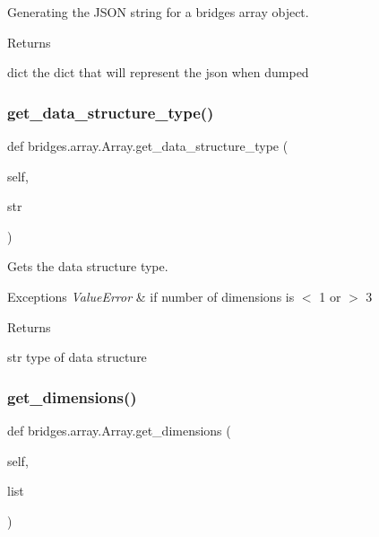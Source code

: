 Generating the J\+S\+ON string for a bridges array object. 

\begin{DoxyReturn}{Returns}


dict the dict that will represent the json when dumped 
\end{DoxyReturn}
\mbox{\label{classbridges_1_1array_1_1_array_a27dcb7a04798a215092f42506da679ce}} 
\subsubsection{\texorpdfstring{get\+\_\+data\+\_\+structure\+\_\+type()}{get\_data\_structure\_type()}}
{\footnotesize\ttfamily def bridges.\+array.\+Array.\+get\+\_\+data\+\_\+structure\+\_\+type (\begin{DoxyParamCaption}\item[{}]{self,  }\item[{}]{str }\end{DoxyParamCaption})}



Gets the data structure type. 


\begin{DoxyExceptions}{Exceptions}
{\em Value\+Error} & if number of dimensions is $<$ 1 or $>$ 3 \\
\hline
\end{DoxyExceptions}
\begin{DoxyReturn}{Returns}


str type of data structure 
\end{DoxyReturn}
\mbox{\label{classbridges_1_1array_1_1_array_ae224fa7fe9363e2d47231e36638b500f}} 
\subsubsection{\texorpdfstring{get\+\_\+dimensions()}{get\_dimensions()}}
{\footnotesize\ttfamily def bridges.\+array.\+Array.\+get\+\_\+dimensions (\begin{DoxyParamCaption}\item[{}]{self,  }\item[{}]{list }\end{DoxyParamCaption})}



